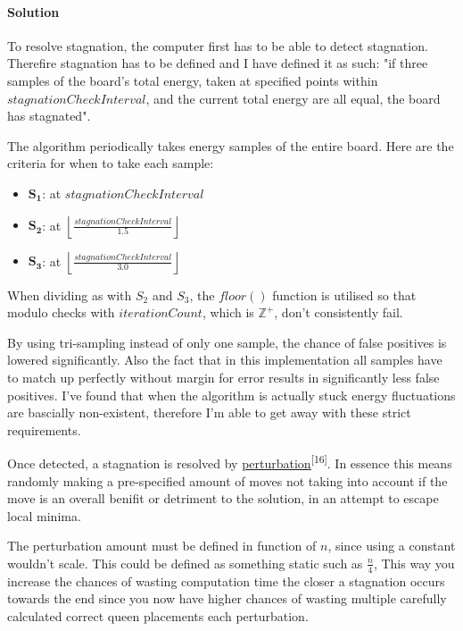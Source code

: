 \documentclass{article}
\begin{document}
\paragraph{Solution}
To resolve stagnation, the computer first has to be able to detect stagnation. Therefire stagnation has to be defined and I have defined it as such:
"if three samples of the board's total energy, taken at specified points within $stagnationCheckInterval$,
and the current total energy are all equal, the board has stagnated".

The algorithm periodically takes energy samples of the entire board.
Here are the criteria for when to take each sample:

\begin{itemize}

    \item \(\mathbf{S_1}\): at \(stagnationCheckInterval\)
    \item \(\mathbf{S_2}\): at \( \left\lfloor \frac{stagnationCheckInterval}{1.5} \right\rfloor\)
    \item \(\mathbf{S_3}\): at \( \left\lfloor \frac{stagnationCheckInterval}{3.0} \right\rfloor\)
\end{itemize}

When dividing as with $S_2$ and $S_3$, the $floor()$ function is utilised so that modulo checks with
\newline $iterationCount$, which is $\mathbb{Z}^+$, don't consistently fail.

By using tri-sampling instead of only one sample, the chance of false positives is lowered significantly.
Also the fact that in this implementation all samples have to match up perfectly without margin for error results in significantly less false positives.
I've found that when the algorithm is actually stuck energy fluctuations are bascially non-existent, therefore I'm able to get away with these strict requirements.

Once detected, a stagnation is resolved by \href{https://en.wikipedia.org/wiki/Perturbation_theory}{perturbation}\textsuperscript{[16]}.
In essence this means randomly making a pre-specified amount of moves not taking into account if the move is an overall benifit or detriment to the solution,
in an attempt to escape local minima.

The perturbation amount must be defined in function of $n$, since using a constant wouldn't scale.
This could be defined as something static such as $\frac{n}{4}$,
This way you increase the chances of wasting computation time the closer a stagnation occurs towards the end
since you now have higher chances of wasting multiple carefully calculated correct queen placements each perturbation.
\end{document}
